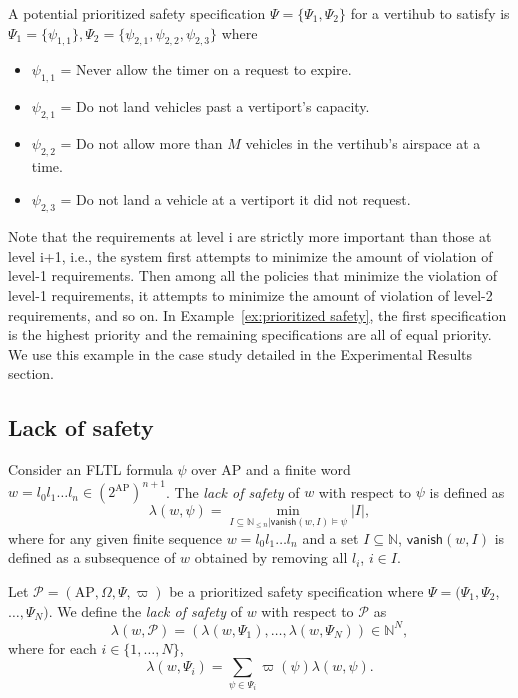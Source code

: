 \begin{eg}\label{ex:prioritized safety}
 A potential prioritized safety specification $\Psi = \{\Psi_1,\Psi_2\}$ for a vertihub to satisfy is $\Psi_1 = \{\psi_{1,1}\}, \Psi_2 = \{\psi_{2,1}, \psi_{2,2}, \psi_{2,3}\}$ where %
\begin{itemize}
    \item $\psi_{1,1}$ = Never allow the timer on a request to expire. 
    \item  $\psi_{2,1}$ = Do not land vehicles past a vertiport's capacity.
    \item  $\psi_{2,2}$ = Do not allow more than $M$ vehicles in the vertihub's airspace at a time.
    \item  $\psi_{2,3}$ = Do not land a vehicle at a vertiport it did not request.
\end{itemize}
\end{eg} 

Note that the requirements at level i are strictly more important than those at level i+1, i.e., the system first attempts to minimize the amount of violation of level-1 requirements. Then among all the policies that minimize the violation of level-1 requirements, it attempts to minimize the amount of violation of level-2 requirements, and so on. In Example~\ref{ex:prioritized safety}, the first specification is the highest priority and the remaining specifications are all of equal priority. We use this example in the case study detailed in the Experimental Results section.

\subsection{Lack of safety}
Consider an FLTL formula $\psi$ over $\text{AP}$ and a finite word $w = l_0 l_1 \ldots l_n \in (2^{\text{AP}})^{n+1}$.
The \emph{lack of safety} of $w$ with respect to $\psi$ is defined as
\begin{equation}
        \lambda(w, \psi) = \min_{I \subseteq \mathbb{N}_{\leq n} |
        \mathsf{vanish}(w, I) \models \psi}
        |I|,
\end{equation}
where for any given finite sequence $w = l_0 l_1 \ldots l_n$
and a set $I \subseteq \mathbb{N}$,
$\mathsf{vanish}(w, I)$ is defined as a subsequence of $w$ obtained by
removing all $l_i$, $i \in I$.

Let $\mathcal{P} = (\text{AP}, \Omega, \Psi, \varpi)$ be a prioritized safety specification where $\Psi = (\Psi_1, \Psi_2,$ $\ldots, \Psi_N)$.
We define the \emph{lack of safety} of $w$ with respect to $\mathcal{P}$ as
\begin{equation}
        \lambda(w, \mathcal{P}) = (\lambda(w, \Psi_1), \ldots, \lambda(w, \Psi_N))
        \in \mathbb{N}^{N},
\end{equation}
where for each $i \in \{1, \ldots, N\}$,
\begin{equation}
        \lambda(w, \Psi_i) =
        \sum_{\psi \in \Psi_i} \varpi(\psi) \lambda(w, \psi).
\end{equation}

